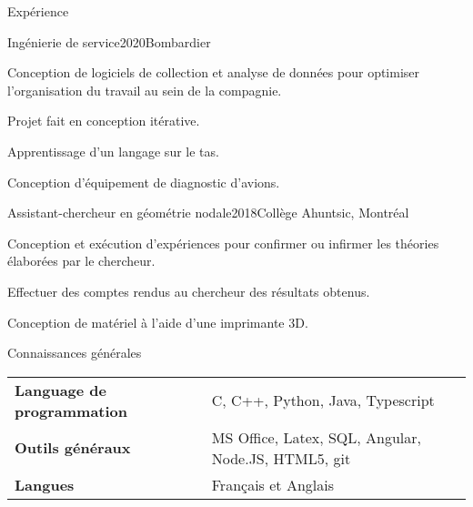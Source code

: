\documentclass[french,12pt]{resume} %
\begin{document}
	\begin{rSection}{Expérience}
		
		\begin{rSubsection}{Ingénierie de service}{2020}{Bombardier}{}{}
			\item Conception de logiciels de collection et analyse de données pour optimiser l'organisation du travail au sein de la compagnie.
			\item Projet fait en conception itérative. 
			\item Apprentissage d'un langage sur le tas.
			\item Conception d'équipement de diagnostic d'avions.
		\end{rSubsection}
		
		\begin{rSubsection}{Assistant-chercheur en géométrie nodale}{2018}{Collège Ahuntsic, Montréal}{}
			\item 	Conception et exécution d'expériences pour confirmer ou infirmer les théories élaborées par le chercheur.
			\item   Effectuer des comptes rendus au chercheur des résultats obtenus.
			\item   Conception de matériel à l’aide d’une imprimante 3D.
		\end{rSubsection}
		
		
	\end{rSection}
	
	

	
	\begin{rSection}{Connaissances générales}
		
		\begin{tabular}{ @{} >{\bfseries}l @{\hspace{6ex}} l }
			Language de programmation \              & C, C++, Python, Java, Typescript \\
			Outils généraux                 & MS Office, Latex, SQL, Angular, Node.JS, HTML5, git \\
			Langues & Français et Anglais
		\end{tabular}
		
	\end{rSection}
	
	
\end{document}
